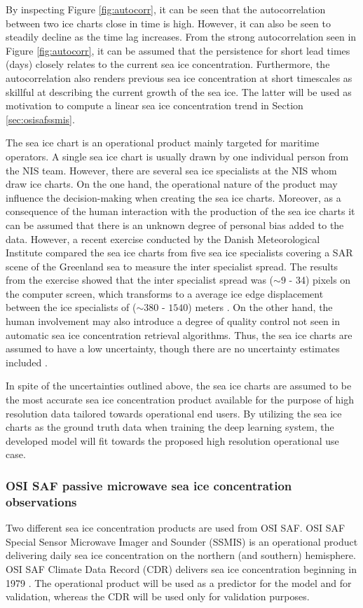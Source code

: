 \documentclass[../main/thesis.tex]{subfiles}
\begin{document}
By inspecting Figure \ref{fig:autocorr}, it can be seen that the autocorrelation between two ice charts close in time is high. However, it can also be seen to steadily decline as the time lag increases. From the strong autocorrelation seen in Figure \ref{fig:autocorr}, it can be assumed that the persistence for short lead times (days) closely relates to the current sea ice concentration. Furthermore, the autocorrelation also renders previous sea ice concentration at short timescales as skillful at describing the current growth of the sea ice. The latter will be used as motivation to compute a linear sea ice concentration trend in Section \ref{sec:osisafssmis}.

The sea ice chart is an operational product mainly targeted for maritime operators. A single sea ice chart is usually drawn by one individual person from the NIS team. However, there are several sea ice specialists at the NIS whom draw ice charts. On the one hand, the operational nature of the product may influence the decision-making when creating the sea ice charts. Moreover, as a consequence of the human interaction with the production of the sea ice charts it can be assumed that there is an unknown degree of personal bias added to the data. However, a recent exercise conducted by the Danish Meteorological Institute compared the sea ice charts from five sea ice specialists covering a SAR scene of the Greenland sea to measure the inter specialist spread. The results from the exercise showed that the inter specialist spread was ($\sim9$ - 34) pixels on the computer screen, which transforms to a average ice edge displacement between the ice specialists of ($\sim380$ - $1540$) meters \citep{Kreiner2023}. On the other hand, the human involvement may also introduce a degree of quality control not seen in automatic sea ice concentration retrieval algorithms. Thus, the sea ice charts are assumed to have a low uncertainty, though there are no uncertainty estimates included \citep{Dinessen2020}.

In spite of the uncertainties outlined above, the sea ice charts are assumed to be the most accurate sea ice concentration product available for the purpose of high resolution data tailored towards operational end users. By utilizing the sea ice charts as the ground truth data when training the deep learning system, the developed model will fit towards the proposed high resolution operational use case.

\subsubsection{OSI SAF passive microwave sea ice concentration observations}
\label{sec:osisaf}
Two different sea ice concentration products are used from OSI SAF. OSI SAF Special Sensor Microwave Imager and Sounder (SSMIS) is an operational product delivering daily sea ice concentration on the northern (and southern) hemisphere. OSI SAF Climate Data Record (CDR) \citep{Soerensen2021} delivers sea ice concentration beginning in 1979 \citep{Lavergne2019}. The operational product will be used as a predictor for the model and for validation, whereas the CDR will be used only for validation purposes.
\end{document}
